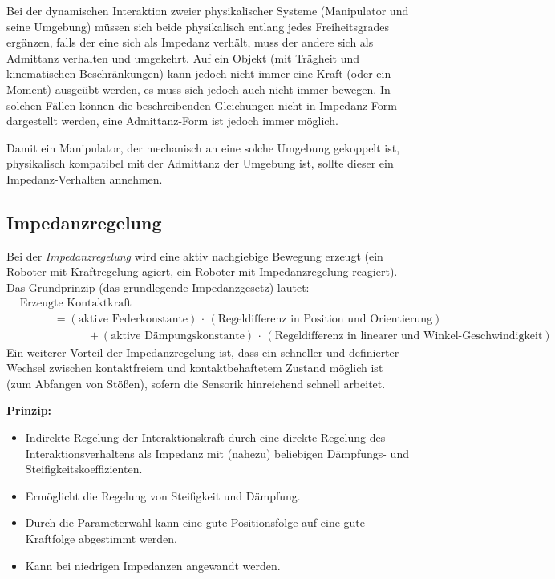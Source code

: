 			Bei der dynamischen Interaktion zweier physikalischer Systeme (Manipulator und seine Umgebung) müssen sich beide physikalisch entlang jedes Freiheitsgrades ergänzen, \dh falls der eine sich als Impedanz verhält, muss der andere sich als Admittanz verhalten und umgekehrt. Auf ein Objekt (mit Trägheit und kinematischen Beschränkungen) kann jedoch nicht immer eine Kraft (oder ein Moment) ausgeübt werden, es muss sich jedoch auch nicht immer bewegen. In solchen Fällen können die beschreibenden Gleichungen nicht in Impedanz-Form dargestellt werden, eine Admittanz-Form ist jedoch immer möglich.
			
			Damit ein Manipulator, der mechanisch an eine solche Umgebung gekoppelt ist, physikalisch kompatibel mit der Admittanz der Umgebung ist, sollte dieser ein Impedanz-Verhalten annehmen.

		\subsection{Impedanzregelung}
			Bei der \emph{Impedanzregelung} wird eine aktiv nachgiebige Bewegung erzeugt (ein Roboter mit Kraftregelung agiert, ein Roboter mit Impedanzregelung reagiert). Das Grundprinzip (\bzw das grundlegende Impedanzgesetz) lautet:
			\begin{align*}
				&\text{Erzeugte Kontaktkraft} \\
					&\quad\quad\quad = (\text{aktive Federkonstante}) \,\cdot\, (\text{Regeldifferenz in Position und Orientierung}) \\
					&\quad\quad\quad\quad\quad\quad + (\text{aktive Dämpungskonstante}) \,\cdot\, (\text{Regeldifferenz in linearer und Winkel-Geschwindigkeit})
			\end{align*}
			Ein weiterer Vorteil der Impedanzregelung ist, dass ein schneller und definierter Wechsel zwischen kontaktfreiem und kontaktbehaftetem Zustand möglich ist (\zB zum Abfangen von Stößen), sofern die Sensorik hinreichend schnell arbeitet.
			
			\textbf{Prinzip:}
			\begin{itemize}
				\item Indirekte Regelung der Interaktionskraft durch eine direkte Regelung des Interaktionsverhaltens als Impedanz mit (nahezu) beliebigen Dämpfungs- und Steifigkeitskoeffizienten.
				\item Ermöglicht die Regelung von Steifigkeit und Dämpfung.
				\item Durch die Parameterwahl kann eine gute Positionsfolge auf eine gute Kraftfolge abgestimmt werden.
				\item Kann bei niedrigen Impedanzen angewandt werden.
			\end{itemize}
		
